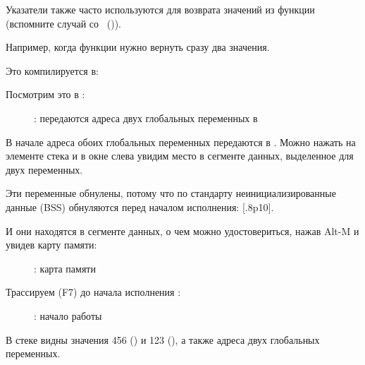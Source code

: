 \myindex{\CLanguageElements!\Pointers}
\label{label_pointers}

Указатели также часто используются для возврата значений из функции (вспомните случай со \scanf{}~()).

Например, когда функции нужно вернуть сразу два значения.




Это компилируется в:



\myindex{\olly}
\clearpage
Посмотрим это в \olly:

\begin{figure}[H]
\centering
{}
\caption{\olly: передаются адреса двух глобальных переменных в \ttfone}
\label{fig:pointers_olly_global_1}
\end{figure}

В начале адреса обоих глобальных переменных передаются в \ttfone.
Можно нажать  на элементе стека и в окне слева 
увидим место в сегменте данных, выделенное для двух переменных.

Эти переменные обнулены, потому что по стандарту неинициализированные данные (\ac{BSS}) 
обнуляются перед началом исполнения: [.8p10].

\clearpage

И они находятся в сегменте данных, о чем можно удостовериться, нажав Alt-M и увидев карту памяти:

\begin{figure}[H]
\centering
{}
\caption{\olly: карта памяти}
\label{fig:pointers_olly_global_5}
\end{figure}

\clearpage
Трассируем (F7) до начала исполнения \ttfone: 

\begin{figure}[H]
\centering
{}
\caption{\olly: начало работы \ttfone}
\label{fig:pointers_olly_global_2}
\end{figure}

В стеке видны значения 456 () и 123 (), а также адреса двух глобальных переменных.

